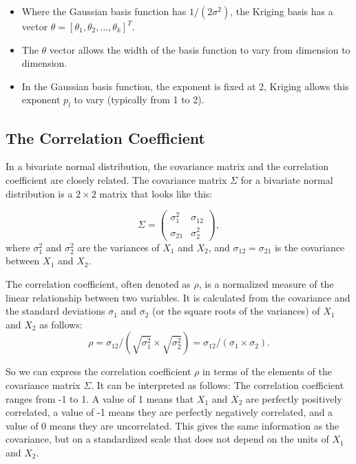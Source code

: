 \documentclass[
  letterpaper,
  DIV=11,
  numbers=noendperiod]{scrreprt}
\providecommand{\tightlist}{%
  \setlength{\itemsep}{0pt}\setlength{\parskip}{0pt}}\usepackage{longtable,booktabs,array}
\begin{document}
\begin{itemize}
\tightlist
\item
  Where the Gaussian basis function has \(1/(2\sigma^2)\), the Kriging
  basis has a vector
  \(\theta = [\theta_1, \theta_2, \ldots, \theta_k]^T\).
\item
  The \(\theta\) vector allows the width of the basis function to vary
  from dimension to dimension.
\item
  In the Gaussian basis function, the exponent is fixed at 2, Kriging
  allows this exponent \(p_l\) to vary (typically from 1 to 2).
\end{itemize}

\subsection{The Correlation
Coefficient}\label{the-correlation-coefficient}

In a bivariate normal distribution, the covariance matrix and the
correlation coefficient are closely related. The covariance matrix
\(\Sigma\) for a bivariate normal distribution is a \(2\times 2\) matrix
that looks like this:

\[
\Sigma =
\begin{pmatrix}
\sigma_1^2 & \sigma_{12}\\
\sigma_{21} & \sigma_2^2
\end{pmatrix},
\] where \(\sigma_1^2\) and \(\sigma_2^2\) are the variances of \(X_1\)
and \(X_2\), and \(\sigma_{12} = \sigma_{21}\) is the covariance between
\(X_1\) and \(X_2\).

The correlation coefficient, often denoted as \(\rho\), is a normalized
measure of the linear relationship between two variables. It is
calculated from the covariance and the standard deviations \(\sigma_1\)
and \(\sigma_2\) (or the square roots of the variances) of \(X_1\) and
\(X_2\) as follows: \[
\rho = \sigma_{12} / (\sqrt{\sigma_1^2} \times \sqrt{\sigma_2^2}) = \sigma_{12} / (\sigma_1 \times \sigma_2).
\]

So we can express the correlation coefficient \(\rho\) in terms of the
elements of the covariance matrix \(\Sigma\). It can be interpreted as
follows: The correlation coefficient ranges from -1 to 1. A value of 1
means that \(X_1\) and \(X_2\) are perfectly positively correlated, a
value of -1 means they are perfectly negatively correlated, and a value
of 0 means they are uncorrelated. This gives the same information as the
covariance, but on a standardized scale that does not depend on the
units of \(X_1\) and \(X_2\).
\end{document}
